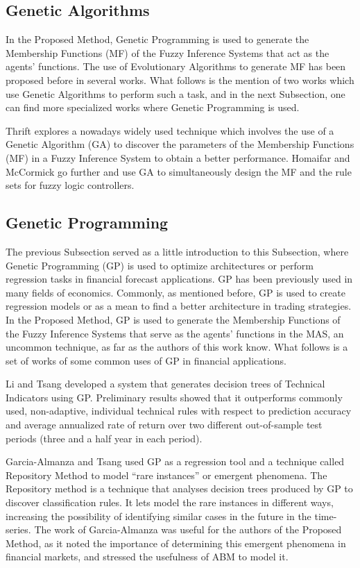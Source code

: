 \documentclass[12pt,journal,draftcls,onecolumn]{IEEEtran}
\begin{document}
\subsection{Genetic Algorithms}
\label{genetic-algorithms}

In the Proposed Method, Genetic Programming is used to generate the Membership Functions (MF) of the Fuzzy Inference Systems that act as the agents' functions. The use of Evolutionary Algorithms to generate MF has been proposed before in several works. What follows is the mention of two works which use Genetic Algorithms to perform such a task, and in the next Subsection, one can find more specialized works where Genetic Programming is used.

Thrift \cite{Thrift1991} explores a nowadays widely used technique which involves the use of a Genetic Algorithm (GA) to discover the parameters of the Membership Functions (MF) in a Fuzzy Inference System to obtain a better performance. Homaifar and McCormick \cite{Homaifar1995} go further and use GA to simultaneously design the MF and the rule sets for fuzzy logic controllers.

\subsection{Genetic Programming}
\label{genetic-programming}

The previous Subsection served as a little introduction to this Subsection, where Genetic Programming (GP) is used to optimize architectures or perform regression tasks in financial forecast applications. GP has been previously used in many fields of economics. Commonly, as mentioned before, GP is used to create regression models or as a mean to find a better architecture in trading strategies. In the Proposed Method, GP is used to generate the Membership Functions of the Fuzzy Inference Systems that serve as the agents' functions in the MAS, an uncommon technique, as far as the authors of this work know. What follows is a set of works of some common uses of GP in financial applications.

Li and Tsang \cite{Li1999} developed a system that generates decision trees of Technical Indicators using GP. Preliminary results showed that it outperforms commonly used, non-adaptive, individual technical rules with respect to prediction accuracy and average annualized rate of return over two different out-of-sample test periods (three and a half year in each period).

Garcia-Almanza and Tsang \cite{Garcia-Almanza2006} used GP as a regression tool and a technique called Repository Method to model ``rare instances'' or emergent phenomena. The Repository method is a technique that analyses decision trees produced by GP to discover classification rules. It lets model the rare instances in different ways, increasing the possibility of identifying similar cases in the future in the time-series. The work of Garcia-Almanza was useful for the authors of the Proposed Method, as it noted the importance of determining this emergent phenomena in financial markets, and stressed the usefulness of ABM to model it.
\end{document}
